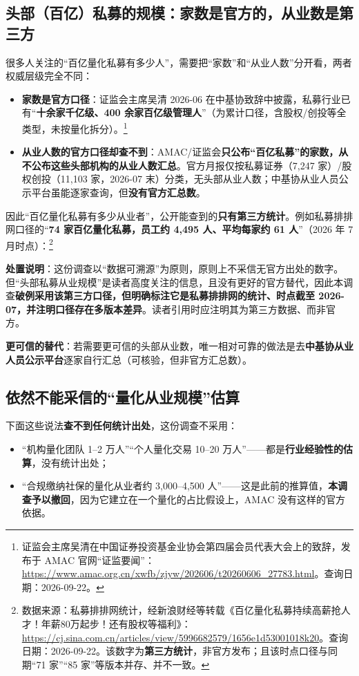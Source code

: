 \documentclass[UTF8,11pt]{ctexart}
\begin{document}
\subsection{头部（百亿）私募的规模：家数是官方的，从业数是第三方}

很多人关注的“百亿量化私募有多少人”，需要把“家数”和“从业人数”分开看，两者权威层级完全不同：

\begin{itemize}[itemsep=2pt]
\item \textbf{家数是官方口径}：证监会主席吴清 2026-06 在中基协致辞中披露，私募行业已有“\textbf{十余家千亿级、400 余家百亿级管理人}”（为累计口径，含股权/创投等全类型，未按量化拆分）。\footnote{证监会主席吴清在中国证券投资基金业协会第四届会员代表大会上的致辞，发布于 AMAC 官网“证监要闻”：\url{https://www.amac.org.cn/xwfb/zjyw/202606/t20260606_27783.html}。查询日期：2026-09-22。}
\item \textbf{从业人数的官方口径却查不到}：AMAC/证监会\textbf{只公布“百亿私募”的家数，从不公布这些头部机构的从业人数汇总}。官方月报仅按私募证券（7,247 家）/股权创投（11,103 家，2026-07 末）分类，无头部从业人数；中基协从业人员公示平台虽能逐家查询，但\textbf{没有官方汇总数}。
\end{itemize}

因此“百亿量化私募有多少从业者”，公开能查到的\textbf{只有第三方统计}。例如私募排排网口径的“\textbf{74 家百亿量化私募，员工约 4,495 人、平均每家约 61 人}”（2026 年 7 月时点）：\footnote{数据来源：私募排排网统计，经新浪财经等转载《百亿量化私募持续高薪抢人才！年薪80万起步！还有股权等福利》：\url{https://cj.sina.com.cn/articles/view/5996682579/1656e1d53001018k20}。查询日期：2026-09-22。该数字为\textbf{第三方统计}，非官方发布；且该时点口径与同期“71 家”“85 家”等版本并存、并不一致。}

\textbf{处置说明}：这份调查以“数据可溯源”为原则，原则上不采信无官方出处的数字。但“头部私募从业规模”是读者高度关注的信息，且没有更好的官方替代，因此本调查\textbf{破例采用该第三方口径，但明确标注它是私募排排网的统计、时点截至 2026-07，并注明口径存在多版本差异}。读者引用时应注明其为第三方数据、而非官方。

\textbf{更可信的替代}：若需要更可信的头部从业数，唯一相对可靠的做法是去\textbf{中基协从业人员公示平台}逐家自行汇总（可核验，但非官方汇总数）。

\subsection{依然不能采信的“量化从业规模”估算}

下面这些说法\textbf{查不到任何统计出处}，这份调查不采用：
\begin{itemize}[itemsep=2pt]
\item “机构量化团队 1--2 万人”“个人量化交易 10--20 万人”——都是\textbf{行业经验性的估算}，没有统计出处；
\item “合规缴纳社保的量化从业者约 3,000--4,500 人”——这是此前的推算值，\textbf{本调查予以撤回}，因为它建立在一个量化的占比假设上，AMAC 没有这样的官方依据。
\end{itemize}
\end{document}
